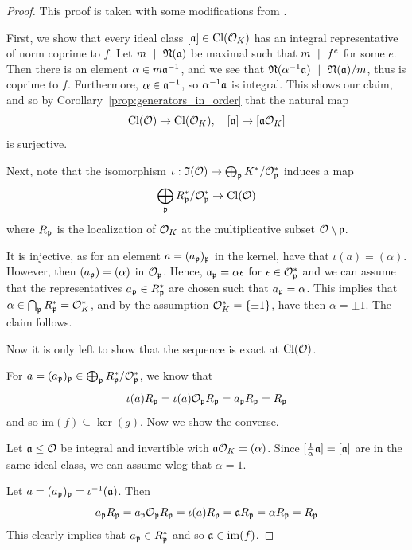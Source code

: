 \begin{proof}
    This proof is taken with some modifications from \cite[Prop.~I.12.11]{neukirch}.

    First, we show that every ideal class $[\mathfrak{a}] \in \mathrm{Cl}(\mathcal{O}_K)$ has an integral representative of norm coprime to $f$.
    Let $m \ \mid \  \mathfrak{N}(\mathfrak{a})$ be maximal such that $m \ \mid \  f^e$ for some $e$.
    Then there is an element $\alpha \in m\mathfrak{a}^{-1}$, and we see that $\mathfrak{N}(\alpha^{-1}\mathfrak{a}) \ \mid \  \mathfrak{N}(\mathfrak{a})/m$, thus is coprime to $f$.
    Furthermore, $\alpha \in \mathfrak{a}^{-1}$, so $\alpha^{-1}\mathfrak{a}$ is integral.
    This shows our claim, and so by Corollary~\ref{prop:generators_in_order} that the natural map
    \begin{equation*}
        \mathrm{Cl}(\mathcal{O}) \to \mathrm{Cl}(\mathcal{O}_K), \quad [\mathfrak{a}] \to [\mathfrak{a}\mathcal{O}_K]
    \end{equation*}
    is surjective.

    Next, note that the isomorphism $\iota: \mathfrak{I}(\mathcal{O}) \to \bigoplus_{\mathfrak{p}} K^*/\mathcal{O}_{\mathfrak{p}}^*$ induces a map
    \begin{equation*}
        \bigoplus_{\mathfrak{p}} R_{\mathfrak{p}}^*/\mathcal{O}_{\mathfrak{p}}^* \to \mathrm{Cl}(\mathcal{O})
    \end{equation*}
    where $R_{\mathfrak{p}}$ is the localization of $\mathcal{O}_K$ at the multiplicative subset $\mathcal{O} \setminus \mathfrak{p}$.

    It is injective, as for an element $a = (a_{\mathfrak{p}})_{\mathfrak{p}}$ in the kernel, have that $\iota(a) = (\alpha)$.
    However, then $(a_{\mathfrak{p}}) = (\alpha)$ in $\mathcal{O}_{\mathfrak{p}}$.
    Hence, $\mathfrak{a}_{\mathfrak{p}} = \alpha\epsilon$ for $\epsilon \in \mathcal{O}_{\mathfrak{p}}^*$ and we can assume that the representatives $a_{\mathfrak{p}} \in R_{\mathfrak{p}}^*$ are chosen such that $a_{\mathfrak{p}} = \alpha$.
    This implies that $\alpha \in \bigcap_{\mathfrak{p}} R_{\mathfrak{p}}^* = \mathcal{O}_K^*$, and by the assumption $\mathcal{O}_K^* = \{ \pm 1 \}$, have then $\alpha = \pm 1$.
    The claim follows.

    Now it is only left to show that the sequence is exact at $\mathrm{Cl}(\mathcal{O})$.

    For $a = (a_{\mathfrak{p}})_{\mathfrak{p}} \in \bigoplus_{\mathfrak{p}} R_{\mathfrak{p}}^*/\mathcal{O}_{\mathfrak{p}}^*$, we know that
    \begin{equation*}
        \iota(a)R_{\mathfrak{p}} = \iota(a)\mathcal{O}_{\mathfrak{p}} R_{\mathfrak{p}} = a_{\mathfrak{p}} R_{\mathfrak{p}} = R_{\mathfrak{p}}
    \end{equation*}
    and so $\mathrm{im}(f) \subseteq \ker(g)$.
    Now we show the converse.

    Let $\mathfrak{a} \leq \mathcal{O}$ be integral and invertible with $\mathfrak{a}\mathcal{O}_K = (\alpha)$.
    Since $[\frac 1 \alpha \mathfrak{a}] = [\mathfrak{a}]$ are in the same ideal class, we can assume wlog that $\alpha = 1$.

    Let $a = (a_{\mathfrak{p}})_{\mathfrak{p}} = \iota^{-1}(\mathfrak{a})$.
    Then
    \begin{equation*}
        a_{\mathfrak{p}} R_{\mathfrak{p}} = a_{\mathfrak{p}}\mathcal{O}_{\mathfrak{p}} R_{\mathfrak{p}} = \iota(a)R_{\mathfrak{p}} = \mathfrak{a} R_{\mathfrak{p}} = \alpha R_{\mathfrak{p}} = R_{\mathfrak{p}}
    \end{equation*}
    This clearly implies that $a_{\mathfrak{p}} \in R_{\mathfrak{p}}^*$ and so $\mathfrak{a} \in \mathrm{im}(f)$.
\end{proof}
